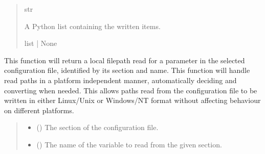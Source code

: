 \documentclass[letterpaper,10pt,english]{sphinxmanual}
\begin{document}
\begin{fulllineitems}
\begin{fulllineitems}
\begin{quote}
\begin{description}
\sphinxAtStartPar
str

\sphinxAtStartPar
A Python list containing the written items.

\sphinxAtStartPar
list | None

\end{description}\end{quote}

\end{fulllineitems}


\begin{fulllineitems}
\label{\detokenize{modules/input/config_handler:qnav.input.config_handler.ConfigHandler.get_value_filepath}}
\pysigstartsignatures
{}
\pysigstopsignatures
\sphinxAtStartPar
This function will return a local filepath read for a parameter in the
selected configuration file, identified by its section and name. This
function will handle read paths in a platform independent manner,
automatically deciding and converting when needed. This allows paths
read from the configuration file to be written in either Linux/Unix or
Windows/NT format without affecting behaviour on different platforms.
\begin{quote}\begin{description}
\begin{itemize}
\item {} 
\sphinxAtStartPar
{} () \textendash{} The section of the configuration file.

\item {} 
\sphinxAtStartPar
{} () \textendash{} The name of the variable to read from the given section.


\end{itemize}
\end{description}
\end{quote}
\end{fulllineitems}
\end{fulllineitems}
\end{document}
